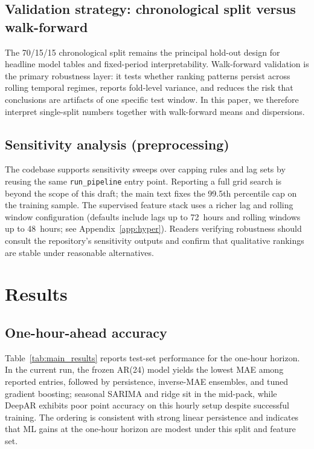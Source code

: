 \documentclass[11pt,a4paper]{article}
\begin{document}
\subsection{Validation strategy: chronological split versus walk-forward}

The 70/15/15 chronological split remains the principal hold-out design for headline model tables and fixed-period interpretability. Walk-forward validation is the primary robustness layer: it tests whether ranking patterns persist across rolling temporal regimes, reports fold-level variance, and reduces the risk that conclusions are artifacts of one specific test window. In this paper, we therefore interpret single-split numbers together with walk-forward means and dispersions.

\subsection{Sensitivity analysis (preprocessing)}

The codebase supports sensitivity sweeps over capping rules and lag sets by reusing the same \texttt{run\_pipeline} entry point. Reporting a full grid search is beyond the scope of this draft; the main text fixes the 99.5th percentile cap on the training sample. The supervised feature stack uses a richer lag and rolling window configuration (defaults include lags up to 72~hours and rolling windows up to 48~hours; see Appendix~\ref{app:hyper}). Readers verifying robustness should consult the repository's sensitivity outputs and confirm that qualitative rankings are stable under reasonable alternatives.

\section{Results}
\label{sec:results}

\subsection{One-hour-ahead accuracy}

Table~\ref{tab:main_results} reports test-set performance for the one-hour horizon. In the current run, the frozen AR(24) model yields the lowest MAE among reported entries, followed by persistence, inverse-MAE ensembles, and tuned gradient boosting; seasonal SARIMA and ridge sit in the mid-pack, while DeepAR exhibits poor point accuracy on this hourly setup despite successful training. The ordering is consistent with strong linear persistence and indicates that ML gains at the one-hour horizon are modest under this split and feature set.
\end{document}
